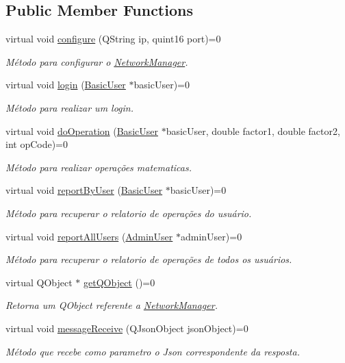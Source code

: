 \subsection*{Public Member Functions}
\begin{DoxyCompactItemize}
\item 
virtual void \hyperlink{classNetworkManager_ae7b073b1deb224a6cb7af0e4d3d158de}{configure} (Q\+String ip, quint16 port)=0
\begin{DoxyCompactList}\small\item\em Método para configurar o \hyperlink{classNetworkManager}{Network\+Manager}. \end{DoxyCompactList}\item 
virtual void \hyperlink{classNetworkManager_ae0f54c8b721ad7ab34e4ce414e23f90f}{login} (\hyperlink{classBasicUser}{Basic\+User} $\ast$basic\+User)=0
\begin{DoxyCompactList}\small\item\em Método para realizar um login. \end{DoxyCompactList}\item 
virtual void \hyperlink{classNetworkManager_acf9c749d6bd57e7e1e4f542a33657425}{do\+Operation} (\hyperlink{classBasicUser}{Basic\+User} $\ast$basic\+User, double factor1, double factor2, int op\+Code)=0
\begin{DoxyCompactList}\small\item\em Método para realizar operações matematicas. \end{DoxyCompactList}\item 
virtual void \hyperlink{classNetworkManager_a2a1c3b3d0bc298a621820e723e3141af}{report\+By\+User} (\hyperlink{classBasicUser}{Basic\+User} $\ast$basic\+User)=0
\begin{DoxyCompactList}\small\item\em Método para recuperar o relatorio de operações do usuário. \end{DoxyCompactList}\item 
virtual void \hyperlink{classNetworkManager_adc90f12e3f926a79382aefbceb3aecfc}{report\+All\+Users} (\hyperlink{classAdminUser}{Admin\+User} $\ast$admin\+User)=0
\begin{DoxyCompactList}\small\item\em Método para recuperar o relatorio de operações de todos os usuários. \end{DoxyCompactList}\item 
virtual Q\+Object $\ast$ \hyperlink{classNetworkManager_a437755d5e84ea8522515283ba11f4b77}{get\+Q\+Object} ()=0
\begin{DoxyCompactList}\small\item\em Retorna um Q\+Object referente a \hyperlink{classNetworkManager}{Network\+Manager}. \end{DoxyCompactList}\item 
virtual void \hyperlink{classNetworkManager_a5200afa56c88ff5d5779a39fec1ab33c}{message\+Receive} (Q\+Json\+Object json\+Object)=0
\begin{DoxyCompactList}\small\item\em Método que recebe como parametro o Json correspondente da resposta. \end{DoxyCompactList}\end{DoxyCompactItemize}
